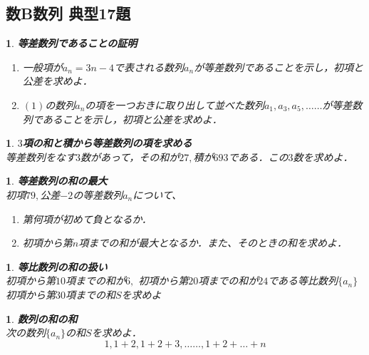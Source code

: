 \documentclass[10pt,
fleqn,
dvipdfmx,
uplatex
]{jsarticle}
\newtheorem{question}[Question]{}
\begin{document}
\subsection{数B数列 典型17題}



\begin{question}{\bf\boldmath 等差数列であることの証明}\\

\begin{enumerate}
\item 一般項が$a_n=3n-4$で表される数列${a_n}$が等差数列であることを示し，初項と公差を求めよ．
\item $\left(1\right)$の数列${a_n}$の項を一つおきに取り出して並べた数列$a_1, a_3, a_5, \dots \dots$が等差数列であることを示し，初項と公差を求めよ．
\end{enumerate}

\end{question}



\begin{question}{\bf\boldmath $3$項の和と積から等差数列の項を求める}\\
等差数列をなす$3$数があって，その和が${27},$積が${693}$である．この$3$数を求めよ．
\end{question}



\begin{question}{\bf\boldmath 等差数列の和の最大}\\
初項${79},$公差$-2$の等差数列${a_n}$について、
\begin{enumerate}
\item 第何項が初めて負となるか．
\item 初項から第$n$項までの和が最大となるか．また、そのときの和を求めよ．
\end{enumerate}

\end{question}



\begin{question}{\bf\boldmath 等比数列の和の扱い}\\
初項から第${10}$項までの和が$6,$
初項から第${20}$項までの和が${24}$である等比数列$\{a_n\}$
初項から第${30}$項までの和$S$を求めよ
\end{question}



\begin{question}{\bf\boldmath 数列の和の和}\\
次の数列$\{a_n\}$の和$S$を求めよ．
\[1,1+2,1+2+3,\dots \dots ,1+2+\dots +n\]
\end{question}
\end{document}
